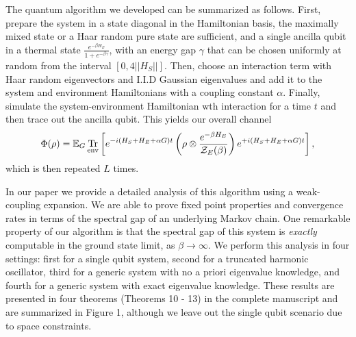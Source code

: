 \documentclass[11pt]{article}
\newcommand{\brackets}[1]{\left[ #1 \right]}
\newcommand{\norm}[1]{\left|\left| #1 \right|\right|}
\DeclareMathOperator{\Tr}{Tr}
\newcommand{\partrace}[2]{\Tr_{#1} \brackets{ #2 }}
\newcommand{\partfun}{\mathcal{Z}}
\begin{document}
The quantum algorithm we developed can be summarized as follows. First, prepare the system in a state diagonal in the Hamiltonian basis, the maximally mixed state or a Haar random pure state are sufficient, and a single ancilla qubit in a thermal state $\frac{e^{-\beta H_E}}{1 + e^{-\beta \gamma}}$, with an energy gap $\gamma$ that can be chosen uniformly at random from the interval $[0, 4\norm{H_S}]$. Then, choose an interaction term with Haar random eigenvectors and I.I.D Gaussian eigenvalues and add it to the system and environment Hamiltonians with a coupling constant $\alpha$. Finally, simulate the system-environment Hamiltonian wth interaction for a time $t$ and then trace out the ancilla qubit. This yields our overall channel
\begin{equation}
    \Phi(\rho) = \mathbb{E}_G \partrace{\rm env}{e^{-i(H_S + H_E + \alpha G) t} \left( \rho \otimes \frac{e^{-\beta H_E}}{\partfun_E(\beta)} \right) e^{+i(H_S + H_E + \alpha G) t} }, \label{eq:phi}
\end{equation}
which is then repeated $L$ times.

In our paper we provide a detailed analysis of this algorithm using a weak-coupling expansion. We are able to prove fixed point properties and convergence rates in terms of the spectral gap of an underlying Markov chain. One remarkable property of our algorithm is that the spectral gap of this system is \emph{exactly} computable in the ground state limit, as $\beta \to \infty$. We perform this analysis in four settings: first for a single qubit system, second for a truncated harmonic oscillator, third for a generic system with no a priori eigenvalue knowledge, and fourth for a generic system with exact eigenvalue knowledge. These results are presented in four theorems (Theorems 10 - 13) in the complete manuscript and are summarized in Figure 1, although we leave out the single qubit scenario due to space constraints. 
\end{document}
